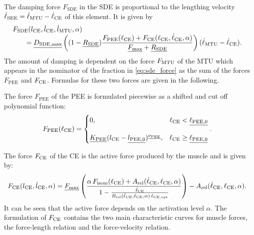The damping force $F_\text{SDE}$ in the SDE is proportional to the lengthing velocity ${\dot{\ell}_\text{SEE} = \dot{\ell}_{\text{MTU}} - \dot{\ell}_{\text{CE}}}$ of this element. It is given by
\begin{equation}\label{eq:sde_force}
  \begin{array}{lll}
    F_\text{SDE}(l_{\text{CE}},\dot{l}_{\text{CE}},\dot{l}_{\text{MTU}},\alpha) \\ \qquad = \underline{D_\text{SDE,max}}\left( (1-\underline{R_\text{SDE}}) \dfrac{F_\text{PEE}(\ell_{\text{CE}})+F_\text{CE}(\ell_{\text{CE}}, \dot{\ell}_{\text{CE}}, \alpha)}{\underline{F_\text{max}} + \underline{R_\text{SDE}}} \right) (\dot{\ell}_{\text{MTU}} - \dot{\ell}_{\text{CE}}).
  \end{array}
\end{equation}
The amount of damping is dependent on the force $F_{\text{MTU}}$ of the MTU which appears in the nominator of the fraction in \cref{eq:sde_force} as the sum of the forces $F_\text{PEE}$ and $F_{\text{CE}}$. Formulas for these two forces are given in the following.

The force $F_\text{PEE}$ of the PEE is formulated piecewise as a shifted and cut off polynomial function:
\begin{equation}\label{eq:fpee}
  \begin{array}{lll}
    F_\text{PEE}(\ell_{\text{CE}}) = \begin{cases}
      0, & \ell_{\text{CE}} < \underline{\ell_{\text{PEE},0}}\\[4mm]
    \underline{K_\text{PEE}}(l_{\text{CE}} - \underline{l_{\text{PEE},0}})^{\underline{\nu_\text{PEE}}},& \ell_{\text{CE}} \geq \underline{\ell_{\text{PEE},0}}
    \end{cases}.
  \end{array}
\end{equation}

The force $F_{\text{CE}}$ of the CE is the active force produced by the muscle and is given by:
\begin{equation}\label{eq:fce}
  \begin{array}{lll}
    F_{\text{CE}}(l_{\text{CE}}, \dot{l}_{\text{CE}}, \alpha) 
    = \underline{F_\text{max}} \left(
    \dfrac{\alpha\,F_\text{isom}(\ell_{\text{CE}}) + A_\text{rel}(\dot{\ell}_{\text{CE}},\ell_{\text{CE}},\alpha)}
    {1 - 
    \frac{\dot{\ell}_{\text{CE}}}
    {B_\text{rel}(\dot{\ell}_{\text{CE}},\ell_{\text{CE}},\alpha)\,\ell_{\text{CE},\text{opt}}}}\right)
    - A_\text{rel}(\dot{\ell}_{\text{CE}},\ell_{\text{CE}},\alpha).
  \end{array}
\end{equation}
It can be seen that the active force depends on the activation level $\alpha$. 
The formulation of $F_{\text{CE}}$ contains the two main characteristic curves for muscle forces, the force-length relation and the force-velocity relation.

